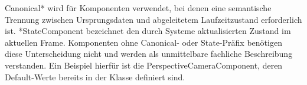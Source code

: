 Canonical* wird für Komponenten verwendet, bei denen eine semantische Trennung zwischen Ursprungsdaten und abgeleitetem Laufzeitzustand erforderlich ist.
*StateComponent bezeichnet den durch Systeme aktualisierten Zustand im aktuellen Frame.
Komponenten ohne Canonical- oder State-Präfix benötigen diese Unterscheidung nicht und werden als unmittelbare fachliche Beschreibung verstanden. Ein Beispiel hierfür ist die PerspectiveCameraComponent, deren Default-Werte bereits in der Klasse definiert sind.